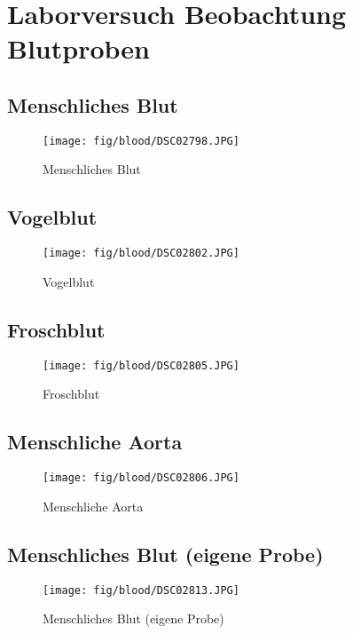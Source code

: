 \section{Laborversuch Beobachtung Blutproben}

\subsection{Menschliches Blut}
\begin{figure}[h!]
    \centering
    \texttt{[image: fig/blood/DSC02798.JPG]}
    \caption{Menschliches Blut}
    \label{fig:human_blood}
\end{figure}
\clearpage

\subsection{Vogelblut}
\begin{figure}[h!]
    \centering
    \texttt{[image: fig/blood/DSC02802.JPG]}
    \caption{Vogelblut}
    \label{fig:bird_blood}
\end{figure}
\clearpage

\subsection{Froschblut}
\begin{figure}[h!]
    \centering
    \texttt{[image: fig/blood/DSC02805.JPG]}
    \caption{Froschblut}
    \label{fig:frog_blood}
\end{figure}
\clearpage

\subsection{Menschliche Aorta}
\begin{figure}[h!]
    \centering
    \texttt{[image: fig/blood/DSC02806.JPG]}
    \caption{Menschliche Aorta}
    \label{fig:human_aorta}
\end{figure}
\clearpage

\subsection{Menschliches Blut (eigene Probe)}
\begin{figure}[h!]
    \centering
    \texttt{[image: fig/blood/DSC02813.JPG]}
    \caption{Menschliches Blut (eigene Probe)}
    \label{fig:human_blood_own}
\end{figure}
\clearpage
